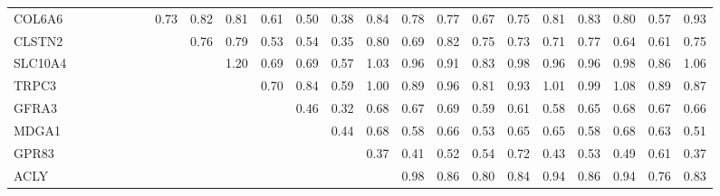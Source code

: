 \begin{longtable}{lrrrrrrrrrrrrrrrrrrrrrr}
COL6A6  &             &             &             &              &             &              &         0.73 &          0.82 &        0.81 &        0.61 &        0.50 &        0.38 &       0.84 &        0.78 &       0.77 &       0.67 &        0.75 &          0.81 &       0.83 &       0.80 &       0.57 &          0.93 \\
CLSTN2  &             &             &             &              &             &              &              &          0.76 &        0.79 &        0.53 &        0.54 &        0.35 &       0.80 &        0.69 &       0.82 &       0.75 &        0.73 &          0.71 &       0.77 &       0.64 &       0.61 &          0.75 \\
SLC10A4 &             &             &             &              &             &              &              &               &        1.20 &        0.69 &        0.69 &        0.57 &       1.03 &        0.96 &       0.91 &       0.83 &        0.98 &          0.96 &       0.96 &       0.98 &       0.86 &          1.06 \\
TRPC3   &             &             &             &              &             &              &              &               &             &        0.70 &        0.84 &        0.59 &       1.00 &        0.89 &       0.96 &       0.81 &        0.93 &          1.01 &       0.99 &       1.08 &       0.89 &          0.87 \\
GFRA3   &             &             &             &              &             &              &              &               &             &             &        0.46 &        0.32 &       0.68 &        0.67 &       0.69 &       0.59 &        0.61 &          0.58 &       0.65 &       0.68 &       0.67 &          0.66 \\
MDGA1   &             &             &             &              &             &              &              &               &             &             &             &        0.44 &       0.68 &        0.58 &       0.66 &       0.53 &        0.65 &          0.65 &       0.58 &       0.68 &       0.63 &          0.51 \\
GPR83   &             &             &             &              &             &              &              &               &             &             &             &             &       0.37 &        0.41 &       0.52 &       0.54 &        0.72 &          0.43 &       0.53 &       0.49 &       0.61 &          0.37 \\
ACLY    &             &             &             &              &             &              &              &               &             &             &             &             &            &        0.98 &       0.86 &       0.80 &        0.84 &          0.94 &       0.86 &       0.94 &       0.76 &          0.83 \\

\end{longtable}
